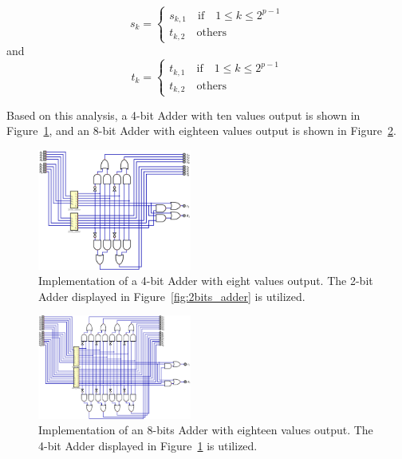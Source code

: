 \documentclass[conference]{IEEEtran}
\begin{document}
\begin{itemize}
\begin{equation}
        s_k = \begin{cases}
            s_{k,1} \quad \text{if} \quad 1 \leq k \leq 2^{p-1} \\
            t_{k,2} \quad \text{others}
        \end{cases}
    \end{equation}
    and
    \begin{equation}
        t_k = \begin{cases}
            t_{k,1} \quad \text{if} \quad 1 \leq k \leq 2^{p-1} \\
            t_{k,2} \quad \text{others}
        \end{cases}
    \end{equation} 
\end{itemize}

Based on this analysis, a 4-bit Adder with ten values output is shown in Figure~\ref{fig:4bits_adder}, and an 8-bit Adder with eighteen values output is shown in Figure~\ref{fig:8bits_adder}.


\begin{figure}[h!]
\centering
\includegraphics[width=0.45\textwidth]{assets/4bits_adder.png}
\caption{Implementation of a 4-bit Adder with eight values output. The 2-bit Adder displayed in Figure~\ref{fig:2bits_adder} is utilized.}
\label{fig:4bits_adder}
\end{figure}

\begin{figure}[h!]
\centering
\includegraphics[width=0.45\textwidth]{assets/8bits_adder.png}
\caption{Implementation of an 8-bits Adder with eighteen values output. The 4-bit Adder displayed in Figure~\ref{fig:4bits_adder} is utilized.}
\label{fig:8bits_adder}
\end{figure}
\end{document}
